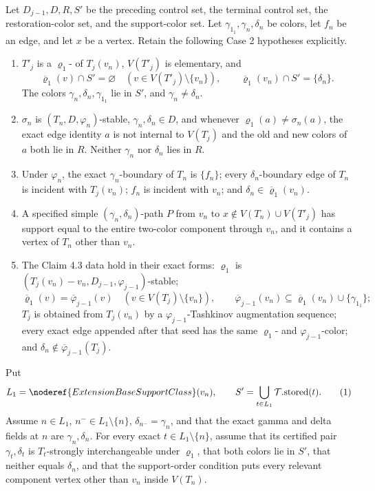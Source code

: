 \begin{lemma}
Let \(D_{j-1},D,R,S'\) be the preceding control set, the terminal control
set, the restoration-color set, and the support-color set.  Let
\(\gamma_{1_1},\gamma_n,\delta_n\) be colors, let \(f_n\) be an edge, and
let \(x\) be a vertex.  Retain the following Case 2 hypotheses explicitly.
\begin{enumerate}
\item \(T'_j\) is a \(\varrho_1\)- of
      \(T_j(v_n)\), \(V(T'_j)\) is elementary, and
      \[
       \overline{\varrho}_1(v)\cap S'=\varnothing
       \quad(v\in V(T'_j)\setminus\{v_n\}),\qquad
       \overline{\varrho}_1(v_n)\cap S'=\{\delta_n\}.          \tag{C2}
      \]
      The colors \(\gamma_n,\delta_n,\gamma_{1_1}\) lie in \(S'\), and
      \(\gamma_n\ne\delta_n\).
\item \(\sigma_n\) is \((T_n,D,\varphi_n)\)-stable,
      \(\gamma_n,\delta_n\in D\), and whenever
      \(\varrho_1(a)\ne\sigma_n(a)\), the exact edge identity \(a\) is not
      internal to \(V(T_j)\) and the old and new colors of \(a\) both lie
      in \(R\).  Neither \(\gamma_n\) nor \(\delta_n\) lies in \(R\).
\item Under \(\varphi_n\), the exact \(\gamma_n\)-boundary of \(T_n\) is
      \(\{f_n\}\); every \(\delta_n\)-boundary edge of \(T_n\) is incident
      with \(T_j(v_n)\); \(f_n\) is incident with \(v_n\); and
      \(\delta_n\in\overline{\varrho}_1(v_n)\).
\item A specified simple \((\gamma_n,\delta_n)\)-path \(P\) from \(v_n\)
      to \(x\notin V(T_n)\cup V(T'_j)\) has support equal to the entire
      two-color component through \(v_n\), and it contains a vertex of
      \(T_n\) other than \(v_n\).
\item The Claim 4.3 data hold in their exact forms: \(\varrho_1\) is
      \((T_j(v_n)-v_n,D_{j-1},\varphi_{j-1})\)-stable;
      \[
       \overline{\varrho}_1(v)=\overline\varphi_{j-1}(v)
       \quad(v\in V(T_j)\setminus\{v_n\}),\qquad
       \overline\varphi_{j-1}(v_n)
       \subseteq\overline{\varrho}_1(v_n)\cup\{\gamma_{1_1}\}; \tag{b2v}
      \]
      \(T_j\) is obtained from \(T_j(v_n)\) by a
      \(\varphi_{j-1}\)-Tashkinov augmentation sequence; every exact edge
      appended after that seed has the same \(\varrho_1\)- and
      \(\varphi_{j-1}\)-color; and
      \(\delta_n\notin\overline\varphi_{j-1}(T_j)\).
\end{enumerate}

Put
\[
 L_1=\noderef{ExtensionBaseSupportClass}(v_n),\qquad
 S'=\bigcup_{t\in L_1}\mathcal T.\mathrm{stored}(t).          \tag{1}
\]
Assume \(n\in L_1\), \(n^-\in L_1\setminus\{n\}\),
\(\delta_{n^-}=\gamma_n\), and that the exact gamma and delta fields at
\(n\) are \(\gamma_n,\delta_n\).  For every exact
\(t\in L_1\setminus\{n\}\), assume that its certified pair
\(\gamma_t,\delta_t\) is \(T_t\)-strongly interchangeable under
\(\varrho_1\), that both colors lie in \(S'\), that neither equals
\(\delta_n\), and that the support-order condition puts every relevant
component vertex other than \(v_n\) inside \(V(T_n)\).


\end{lemma}
